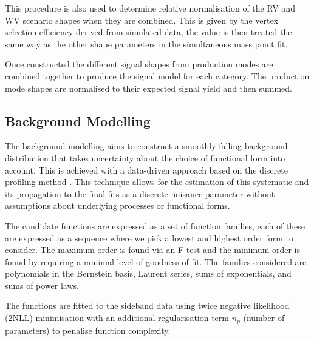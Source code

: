 This procedure is also used to determine relative normalisation of the RV and WV scenario shapes when they are combined. This is given by the vertex selection efficiency derived from simulated data, the value is then treated the same way as the other shape parameters in the simultaneous mass point fit. 

Once constructed the different signal shapes from production modes are combined together to produce the signal model for each category. The production mode shapes are normalised to their expected signal yield and then summed.



\subsection{Background Modelling}
The background modelling aims to construct a smoothly falling background distribution that takes uncertainty about the choice of functional form into account. This is achieved with a data-driven approach based on the discrete profiling method \cite{env_method}. This technique allows for the estimation of this systematic and its propagation to the final fits as a discrete nuisance parameter without assumptions about underlying processes or functional forms. 

The candidate functions are expressed as a set of function families, each of these are expressed as a sequence where we pick a lowest and highest order form to consider. The maximum order is found via an F-test and the minimum order is found by requiring a minimal level of goodness-of-fit. 
The families considered are polynomials in the Bernstein basis, Laurent series, sums of exponentials, and sums of power laws. 

The functions are fitted to the \mgg sideband data using twice negative likelihood (2NLL) minimisation with an additional regularisation term $n_p$ (number of parameters) to penalise function complexity. 



